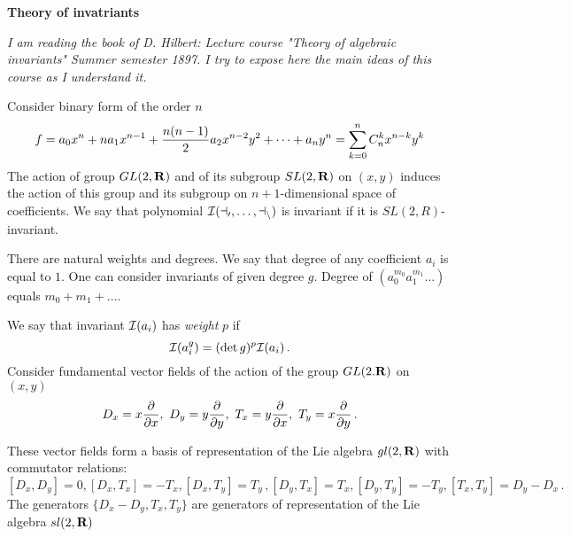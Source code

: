 \def\p{\partial}
\def\t {\tilde}
\def \m {\medskip}
\def\degree {{\bf {\rm degree}\,\,}}
\def \finish {${\,\,\vrule height1mm depth2mm width 8pt}$}





\def\a {\alpha}
\def\vare{{\varepsilon}}
\def\l {\lambda}
\def\s {{\sigma}}

\def\G {{\Gamma}}

\def\A {{\bf A}}
\def\C {{\bf C}}
\def\E  {{\bf E}}
\def\K {{\bf K}}
\def\N {{\bf N}}
\def\Q {{\bf Q}}
\def\R  {{\bf R}}
\def\V {{\cal V}}
\def \X   {{\bf X}}
\def \Y   {{\bf Y}}
\def\Z {{\bf Z}}



\def\ac {{\bf a}}
\def\e{{\bf e}}
\def\f {{\bf f}}
\def\n {{\bf n}}
\def\r {{\bf r}}
\def\v {{\bf v}}
\def \x   {{\bf x}}
\def \y   {{\bf y}}


\def\pt {{\bf pt}}
\def \wt {\widetilde}


\centerline {\bf Theory of invatriants}

\m

 {\it I am reading the book of D. Hilbert: Lecture course "Theory of algebraic invariants"
   Summer semester 1897.  I try to expose here the main ideas of this course
   as I understand it.}

   \m

          Consider binary form of the order $n$
                    $$
         f=a_0x^n+na_1x^{n-1}+{n(n-1)\over 2}a_2x^{n-2}y^2+\dots+a_ny^n=\sum_{k=0}^n C^k_nx^{n-k}y^k
                    $$
    The action of group $GL(2,\R)$ and of its subgroup $SL(2,\R)$ on $(x,y)$ induces the action of this group
    and its subgroup on $n+1$-dimensional space of coefficients.
   We say that polynomial $\cal I (a_0,\dots,a_n)$ is invariant if it is $SL(2,R)$-invariant.

   There are natural weights and degrees. We say that degree of any coefficient $a_i$ is equal to $1$.
   One can consider invariants of given degree $g$. Degree of
 $(a_0^{m_0} a_1^{m_1}...)$ equals $m_0+m_1+\dots$.

   We say that invariant ${\cal I}(a_i)$ has {\it weight} $p$ if
                $$
                {\cal I}(a^g_i)=(\det g)^p{\cal I}(a_i)\,.
                $$
   Consider fundamental vector fields of the action of the group $GL(2.\R)$ on $(x,y)$
                $$
D_x=x{\p\over \p x},\,\,D_y=y{\p\over \p y}, \,\,T_x=y{\p\over \p x},\,\,T_y=x{\p\over \p y}\,.
                $$

These vector fields form a basis of  representation of the Lie algebra $gl (2,\R)$ with commutator relations:
                 $$
   [D_x,D_y]=0, [D_x,T_x]=-T_x, [D_x,T_y]=T_y\,, [D_y,T_x]=T_x, [D_y, T_y]=-T_y, [T_x,T_y]=D_y-D_x\,.
                 $$
   The generators  $\{D_x-D_y, T_x, T_y\}$ are generators of representation of the Lie algebra $sl (2,\R)$

